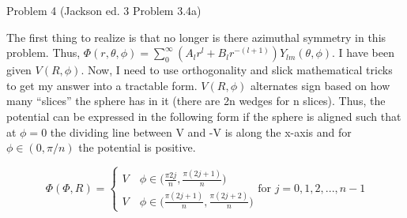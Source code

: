 \begin{homeworkProblem}{Problem 4 (Jackson ed. 3 Problem 3.4a)}

The first thing to realize is that no longer is there azimuthal symmetry in this problem. Thus, $\Phi(r,\theta,\phi) = \sum\limits_0^\infty (A_l r^l + B_l r^{-(l+1)})Y_{lm}(\theta,\phi)$. I have been given $V(R,\phi)$. Now, I need to use orthogonality and slick mathematical tricks to get my answer into a tractable form. $V(R,\phi)$ alternates sign based on how many ``slices'' the sphere has in it (there are 2n wedges for n slices). Thus, the potential can be expressed in the following form if the sphere is aligned such that at $\phi = 0$ the dividing line between V and -V is along the x-axis and for $\phi \in (0,\pi/n)$ the potential is positive.

\[
\Phi(\Phi,R) =
\begin{cases}
V \quad \phi \in \big(\frac{\pi 2j}{n},\frac{\pi (2j+1)}{n}\big) \\
V \quad \phi \in \big(\frac{\pi (2j+1)}{n},\frac{\pi (2j+2)}{n}\big)
\end{cases}
\text{for $j = 0,1,2,...,n-1$}
\]

\end{homeworkProblem}